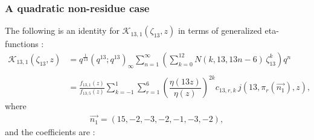 \documentclass[12pt]{amsart}
\theoremstyle{definition}
\theoremstyle{remark}
\numberwithin{equation}{section}
\newcommand\Lpar[1]{\left(#1\right)}
\begin{document}
\subsubsection{\textbf{A quadratic non-residue case}}

The following is an identity for $\mathcal{K}_{13,1}(\zeta_{13},z)$ in terms of generalized eta-functions : 
\\
\begin{align}
\mathcal{K}_{13,1}(\zeta_{13},z)&=q^\frac{1}{13}(q^{13};q^{13})_\infty \sum_{n=1}^\infty \Lpar{\sum_{k=0}^{12} N(k,13,13n-6)\,\zeta_{13}^k}q^n \label{eq:rank13id3} \\
\nonumber
\\
&=\frac{f_{13,1}(z)}{f_{13,5}(z)}\sum_{k=-1}^{1}\sum_{r=1}^{6} \left(\dfrac{\eta(13z)}{\eta(z)}\right)^{2k}c_{13,r,k}\,j(13,\pi_r(\overrightarrow{n_1}),z),
\nonumber
\end{align}
where 
\begin{align*}
\overrightarrow{n_1}=(15,-2,-3,-2,-1,-3,-2),
\end{align*}
and the coefficients are :
\end{document}
